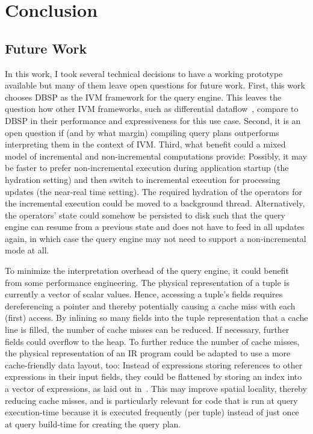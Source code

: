 
\chapter{Conclusion}\label{ch:conclusion}

\section{Future Work}\label{sec:future-work}

In this work, I took several technical decisions to have a working prototype
available but many of them leave open questions for future work.
First, this work chooses DBSP as the \ac{IVM} framework for the query engine.
This leaves the question how other \ac{IVM} frameworks, such as differential
dataflow~\cite{mcsherry2013differential}, compare to DBSP in their performance
and expressiveness for this use case.
Second, it is an open question if (and by what margin) compiling query plans
outperforms interpreting them in the context of \ac{IVM}.
Third, what benefit could a mixed model of incremental and non-incremental
computations provide:
Possibly, it may be faster to prefer non-incremental execution during application
startup (the hydration setting) and then switch to incremental execution for
processing updates (the near-real time setting).
The required hydration of the operators for the incremental execution could be
moved to a background thread.
Alternatively, the operators' state could somehow be persisted to disk such that
the query engine can resume from a previous state and does not have to
feed in all updates again, in which case the query engine may not need
to support a non-incremental mode at all.

To minimize the interpretation overhead of the query engine, it could
benefit from some performance engineering.
The physical representation of a tuple is currently a vector of scalar values.
Hence, accessing a tuple's fields requires dereferencing a pointer and thereby
potentially causing a cache miss with each (first) access.
By inlining so many fields into the tuple representation that a cache line
is filled, the number of cache misses can be reduced.
If necessary, further fields could overflow to the heap\footnotemark{}.
To further reduce the number of cache misses, the physical representation of an
\ac{IR} program could be adapted to use a more cache-friendly data layout, too:
Instead of expressions storing references to other expressions in their
input fields, they could be flattened by storing an index into a vector of
expressions, as laid out in~\cite{sampson2023flattening}.
This may improve spatial locality, thereby reducing cache misses, and is
particularly relevant for code that is run at query execution-time because
it is executed frequently (per tuple) instead of just once at query build-time
for creating the query plan.

